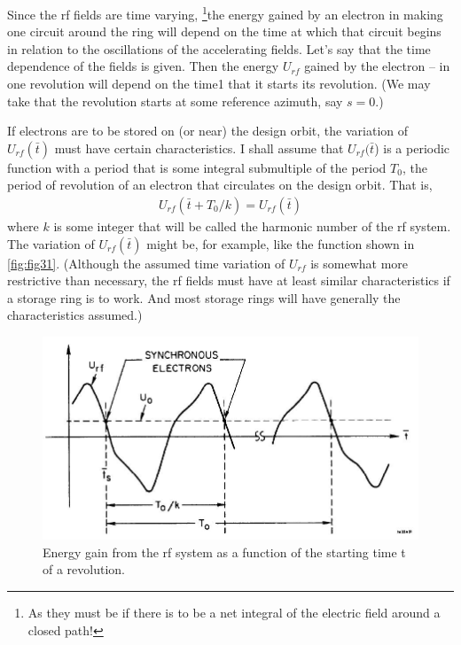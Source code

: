 Since the rf fields are time varying, \footnote{As they must be if there is to be a net integral of the electric field around a closed path!}the energy gained by an electron in making one circuit around the ring will depend on the time at which that circuit begins in relation to the oscillations of the accelerating fields. Let's say that the time dependence of the fields is given. Then the energy $U_{rf}$ gained by the electron -- in one revolution will depend on the time1 that it starts its revolution. (We may take that the revolution starts at some reference azimuth, say $s = 0$.)

If electrons are to be stored on (or near) the design orbit, the variation of $U_{rf}(\bar{t})$ must have certain characteristics. I shall assume that $U_{rf}(\bar{t}$) is a periodic function with a period that is some integral submultiple of the period $T_0$, the period of revolution of an electron that circulates on the design orbit. That is,
\begin{align}
	U_{rf}(\bar{t}+T_0/k) = U_{rf}(\bar{t})\label{eq:3.25}
\end{align}
where $k$ is some integer that will be called the harmonic number of the rf system. The variation of $U_{rf}(\bar{t})$ might be, for example, like the function shown in \autoref{fig:fig31}. (Although the assumed time variation of $U_{rf}$ is somewhat more restrictive than necessary, the rf fields must have at least similar characteristics if a storage ring is to work. And most storage rings will have generally the characteristics assumed.)

\begin{figure}[!htb]
	\centering
	\includegraphics[width=0.85\linewidth]{./Figuras/fig31.jpeg}
	\caption{Energy gain from the rf system as a function of the starting time t of a revolution.}
	\label{fig:fig31}
\end{figure}

